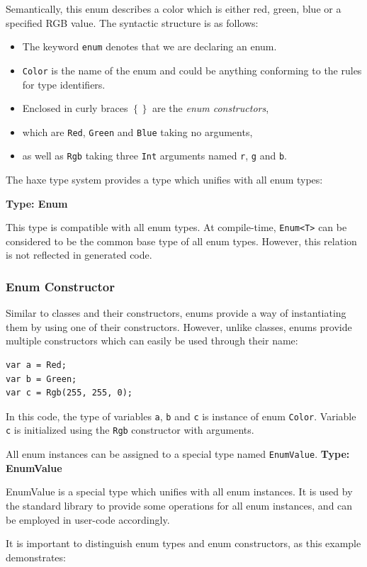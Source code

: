 \documentclass{article}
\newcommand{\type}[1]{\texttt{#1}}
\newcommand{\expr}[1]{\texttt{#1}}
\newenvironment{myshaded}
  {\def\FrameCommand{\fboxsep=\topsep\colorbox{bgcolor}}%
  \MakeFramed {\advance\hsize-\width \FrameRestore}}%
 {\endMakeFramed}
\newcommand{\define}[3][Definition]
	{\begin{myshaded}\noindent\textbf{#1: #2}\par\nobreak\noindent\ignorespaces#3\label{def:#2}\end{myshaded}}
\newcommand{\haxe}[2][]{%
}
\begin{document}
\haxe{assets/Color.hx}
Semantically, this enum describes a color which is either red, green, blue or a specified RGB value. The syntactic structure is as follows:
\begin{itemize}
	\item The keyword \expr{enum} denotes that we are declaring an enum.
	\item \type{Color} is the name of the enum and could be anything conforming to the rules for type identifiers.
	\item Enclosed in curly braces \expr{$\left\{\right\}$} are the \emph{enum constructors},
	\item which are \expr{Red}, \expr{Green} and \expr{Blue} taking no arguments,
	\item as well as \expr{Rgb} taking three \type{Int} arguments named \expr{r}, \expr{g} and \expr{b}.
\end{itemize}
The haxe type system provides a type which unifies with all enum types:

\define[Type]{Enum}{This type is compatible with all enum types. At compile-time, \type{Enum<T>} can be considered to be the common base type of all enum types. However, this relation is not reflected in generated code.} 

\subsubsection{Enum Constructor}
\label{Enum Constructor}

Similar to classes and their constructors, enums provide a way of instantiating them by using one of their constructors. However, unlike classes, enums provide multiple constructors which can easily be used through their name:

\begin{lstlisting}
var a = Red;
var b = Green;
var c = Rgb(255, 255, 0);
\end{lstlisting}
In this code, the type of variables \expr{a}, \expr{b} and \expr{c} is instance of enum \type{Color}. Variable \expr{c} is initialized using the \expr{Rgb} constructor with arguments.

All enum instances can be assigned to a special type named \type{EnumValue}.
\define[Type]{EnumValue}{EnumValue is a special type which unifies with all enum instances. It is used by the standard library to provide some operations for all enum instances, and can be employed in user-code accordingly.}

It is important to distinguish enum types and enum constructors, as this example demonstrates:
\end{document}

